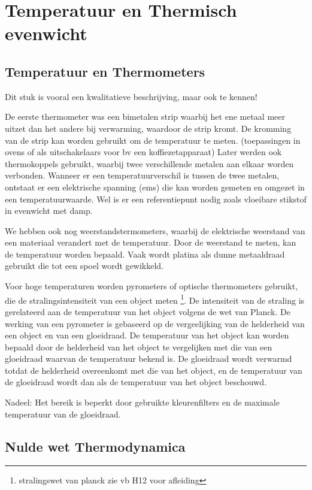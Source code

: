 \section{Temperatuur en Thermisch evenwicht}

\subsection{Temperatuur en Thermometers}

Dit stuk is vooral een kwalitatieve beschrijving, maar ook te kennen!

De eerste thermometer was een bimetalen strip waarbij het ene metaal meer uitzet dan het andere bij verwarming, waardoor de strip kromt. De kromming van de strip kan worden gebruikt om de temperatuur te meten. (toepassingen in ovens of als uitschakelaars voor bv een koffiezetapparaat)
Later werden ook thermokoppels gebruikt, waarbij twee verschillende metalen aan elkaar worden verbonden. Wanneer er een temperatuurverschil is tussen de twee metalen, ontstaat er een elektrische spanning (ems) die kan worden gemeten en omgezet in een temperatuurwaarde. Wel is er een referentiepunt nodig zoals vloeibare stikstof in evenwicht met damp.

We hebben ook nog weerstandstermometers, waarbij de elektrische weerstand van een materiaal verandert met de temperatuur. Door de weerstand te meten, kan de temperatuur worden bepaald. Vaak wordt platina als dunne metaaldraad gebruikt die tot een spoel wordt gewikkeld.

Voor hoge temperaturen worden pyrometers of optische thermometers gebruikt, die de stralingsintensiteit van een object meten \footnote{stralingswet van planck zie vb H12 voor afleiding}. De intensiteit van de straling is gerelateerd aan de temperatuur van het object volgens de wet van Planck.
De werking van een pyrometer is gebaseerd op de vergeelijking van de helderheid van een object en van een gloeidraad. De temperatuur van het object kan worden bepaald door de helderheid van het object te vergelijken met die van een gloeidraad waarvan de temperatuur bekend is. De gloeidraad wordt verwarmd totdat de helderheid overeenkomt met die van het object, en de temperatuur van de gloeidraad wordt dan als de temperatuur van het object beschouwd.  

Nadeel: Het bereik is beperkt door gebruikte kleurenfilters en de maximale temperatuur van de gloeidraad.

\subsection{Nulde wet Thermodynamica}

